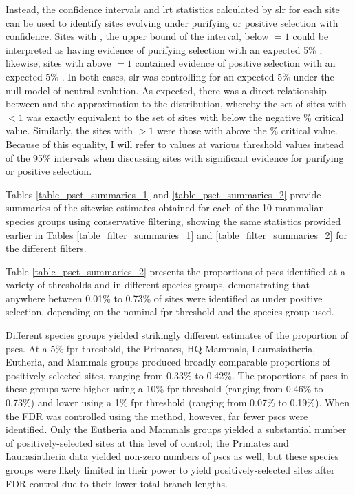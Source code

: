 Instead, the confidence intervals and \ac{lrt} statistics calculated
by \ac{slr} for each site can be used to identify sites evolving
under purifying or positive selection with confidence. Sites with
\ciup, the upper bound of the \ci interval, below \omg$=1$ could be
interpreted as having evidence of purifying selection with an expected
5\% \fpr; likewise, sites with \cidown above \omg$=1$ contained
evidence of positive selection with an expected 5\% \fpr. In both
cases, \ac{slr} was controlling for an expected 5\% \fpr under the
null model of neutral evolution. As expected, there was a direct
relationship between \ciup and the \chisq approximation to the \slrt
distribution, whereby the set of sites with \ciup$<1$ was exactly
equivalent to the set of sites with \slrt below the negative \% critical value. Similarly, the sites with \cidown$>1$ were those
with \slrt above the \% critical value. Because of this
equality, I will refer to \slrt values at various \chisq threshold
values instead of the 95\% \ci intervals when discussing sites with
significant evidence for purifying or positive selection.

Tables \ref{table_pset_summaries_1} and \ref{table_pset_summaries_2}
provide summaries of the sitewise estimates obtained for each of the
10 mammalian species groups using conservative filtering, showing the
same statistics provided earlier in Tables
\ref{table_filter_summaries_1} and \ref{table_filter_summaries_2} for
the different filters.

Table \ref{table_pset_summaries_2} presents the proportions of
\acp{psc} identified at a variety of \slrt thresholds and in different
species groups, demonstrating that anywhere between 0.01\% to 0.73\%
of sites were identified as under positive selection, depending on the
nominal \ac{fpr} threshold and the species group used.

Different species groups yielded strikingly different estimates of the
proportion of \acp{psc}. At a 5\% \ac{fpr} threshold, the Primates, HQ
Mammals, Laurasiatheria, Eutheria, and Mammals groups produced broadly
comparable proportions of positively-selected sites, ranging from
0.33\% to 0.42\%. The proportions of \acp{psc} in these groups were
higher using a 10\% \ac{fpr} threshold (ranging from 0.46\% to 0.73\%)
and lower using a 1\% \ac{fpr} threshold (ranging from 0.07\% to
0.19\%). When the FDR was controlled using the \citet{Benjamini1995}
method, however, far fewer \acp{psc} were identified. Only the
Eutheria and Mammals groups yielded a substantial number of
positively-selected sites at this level of control; the Primates and
Laurasiatheria data yielded non-zero numbers of \acp{psc} as well, but
these species groups were likely limited in their power to yield
positively-selected sites after FDR control due to their lower total
branch lengths.

